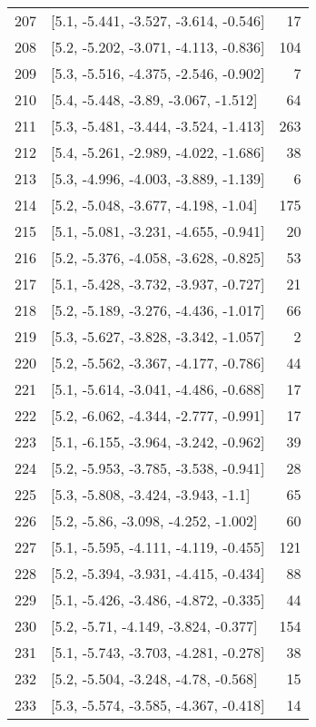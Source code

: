 \documentclass{article}%
\begin{document}
\begin{longtable}{llr}
207 &  [5.1, -5.441, -3.527, -3.614, -0.546] &      17 \\
208 &  [5.2, -5.202, -3.071, -4.113, -0.836] &     104 \\
209 &  [5.3, -5.516, -4.375, -2.546, -0.902] &       7 \\
210 &   [5.4, -5.448, -3.89, -3.067, -1.512] &      64 \\
211 &  [5.3, -5.481, -3.444, -3.524, -1.413] &     263 \\
212 &  [5.4, -5.261, -2.989, -4.022, -1.686] &      38 \\
213 &  [5.3, -4.996, -4.003, -3.889, -1.139] &       6 \\
214 &   [5.2, -5.048, -3.677, -4.198, -1.04] &     175 \\
215 &  [5.1, -5.081, -3.231, -4.655, -0.941] &      20 \\
216 &  [5.2, -5.376, -4.058, -3.628, -0.825] &      53 \\
217 &  [5.1, -5.428, -3.732, -3.937, -0.727] &      21 \\
218 &  [5.2, -5.189, -3.276, -4.436, -1.017] &      66 \\
219 &  [5.3, -5.627, -3.828, -3.342, -1.057] &       2 \\
220 &  [5.2, -5.562, -3.367, -4.177, -0.786] &      44 \\
221 &  [5.1, -5.614, -3.041, -4.486, -0.688] &      17 \\
222 &  [5.2, -6.062, -4.344, -2.777, -0.991] &      17 \\
223 &  [5.1, -6.155, -3.964, -3.242, -0.962] &      39 \\
224 &  [5.2, -5.953, -3.785, -3.538, -0.941] &      28 \\
225 &    [5.3, -5.808, -3.424, -3.943, -1.1] &      65 \\
226 &   [5.2, -5.86, -3.098, -4.252, -1.002] &      60 \\
227 &  [5.1, -5.595, -4.111, -4.119, -0.455] &     121 \\
228 &  [5.2, -5.394, -3.931, -4.415, -0.434] &      88 \\
229 &  [5.1, -5.426, -3.486, -4.872, -0.335] &      44 \\
230 &   [5.2, -5.71, -4.149, -3.824, -0.377] &     154 \\
231 &  [5.1, -5.743, -3.703, -4.281, -0.278] &      38 \\
232 &   [5.2, -5.504, -3.248, -4.78, -0.568] &      15 \\
233 &  [5.3, -5.574, -3.585, -4.367, -0.418] &      14 \\

\end{longtable}
\end{document}
